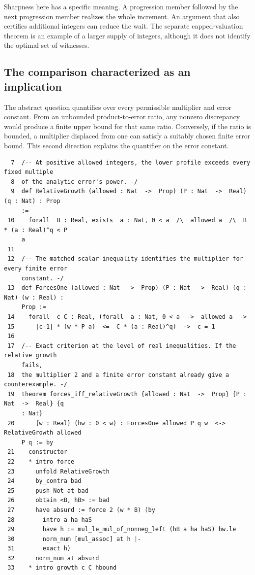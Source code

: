 \documentclass[12pt,letterpaper]{article}
\begin{document}
Sharpness here has a specific meaning. A progression member followed by the next progression member realizes the whole increment. An argument that also certifies additional integers can reduce the wait. The separate capped-valuation theorem is an example of a larger supply of integers, although it does not identify the optimal set of witnesses.
\clearpage{}\subsection*{The comparison characterized as an implication}\label{extract-GrowthConsumer7}
The abstract question quantifies over every permissible multiplier and error constant. From an unbounded product-to-error ratio, any nonzero discrepancy would produce a finite upper bound for that same ratio. Conversely, if the ratio is bounded, a multiplier displaced from one can satisfy a suitably chosen finite error bound. This second direction explains the quantifier on the error constant.
\par
{\fontsize{9.2}{11.2}\selectfont\begin{verbatim}
  7  /-- At positive allowed integers, the lower profile exceeds every fixed multiple
  8  of the analytic error's power. -/
  9  def RelativeGrowth (allowed : Nat  ->  Prop) (P : Nat  ->  Real) (q : Nat) : Prop
     :=
 10    forall  B : Real, exists  a : Nat, 0 < a  /\  allowed a  /\  B * (a : Real)^q < P
     a
 11
 12  /-- The matched scalar inequality identifies the multiplier for every finite error
     constant. -/
 13  def ForcesOne (allowed : Nat  ->  Prop) (P : Nat  ->  Real) (q : Nat) (w : Real) :
     Prop :=
 14    forall  c C : Real, (forall  a : Nat, 0 < a  ->  allowed a  ->
 15      |c-1| * (w * P a)  <=  C * (a : Real)^q)  ->  c = 1
 16
 17  /-- Exact criterion at the level of real inequalities. If the relative growth
     fails,
 18  the multiplier 2 and a finite error constant already give a counterexample. -/
 19  theorem forces_iff_relativeGrowth {allowed : Nat  ->  Prop} {P : Nat  ->  Real} {q
     : Nat}
 20      {w : Real} (hw : 0 < w) : ForcesOne allowed P q w  <->  RelativeGrowth allowed
     P q := by
 21    constructor
 22    * intro force
 23      unfold RelativeGrowth
 24      by_contra bad
 25      push Not at bad
 26      obtain <B, hB> := bad
 27      have absurd := force 2 (w * B) (by
 28        intro a ha haS
 29        have h := mul_le_mul_of_nonneg_left (hB a ha haS) hw.le
 30        norm_num [mul_assoc] at h |-
 31        exact h)
 32      norm_num at absurd
 33    * intro growth c C hbound
\end{verbatim}}
\end{document}
